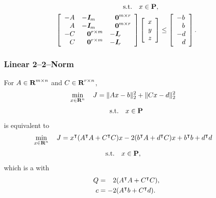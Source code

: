 \documentclass{article}
\begin{document}
    \begin{align*}
        \st\quad &x\in\poly,
        \\
        \left[\begin{array}{lll}
                -A
            &
                -\eye_m
            &
            \minus\zeros^{m\times r}
            \\
                \minus A
            &
                -\eye_m
            &
            \minus\zeros^{m\times r}
            \\
            -C
            &
            \minus\zeros^{r\times m}
            &
            -\eye_r
            \\
                \minus C
            &
            \minus\zeros^{r\times m}
            &
                -\eye_r                
        \end{array}\right]
        &
        \left[\begin{array}{c}
            x   \\
            y \\
            z
        \end{array}\right]
        \leq
        \left[\begin{array}{l}
            -b                \\
            \minus b \\
            -d \\
            \minus d
        \end{array}\right].
    \end{align*}

\subsubsection{Linear 2--2--Norm}
For $A\in\textbf{R}^{m\times n}$ and $C\in\textbf{R}^{r\times n}$,
\begin{align*}
    \min_{x\in\textbf{R}^n}\quad J & = \|A x-b\|_2^2 + \|C x - d\|_2^2
\end{align*}
\begin{align*}
    \text{s.t.}\quad x\in\textbf{P}
\end{align*}
is equivalent to
\begin{align*}
\min_{x\in\textbf{R}^n}
\quad J & = x^\intercal (A^\intercal A + C^\intercal C) x - 2(b^\intercal A + d^\intercal C)x + b^\intercal b+d^\intercal d
\end{align*}
\begin{align*}
    \text{s.t.}\quad &x\in\textbf{P},
\end{align*}
which is a \QP with 
\begin{align*}
    Q&=\minus 2(A^\tp A + C^\tp C),\\
    c&=- 2( A^\tp b + C^\tp d).
\end{align*}
\end{document}
